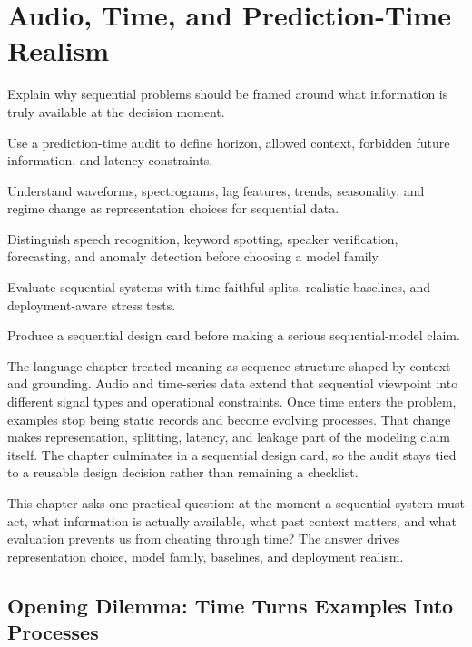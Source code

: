 \chapter{Audio, Time, and Prediction-Time Realism}

\begin{learninggoals}
\item Explain why sequential problems should be framed around what information is truly available at the decision moment.
\item Use a prediction-time audit to define horizon, allowed context, forbidden future information, and latency constraints.
\item Understand waveforms, spectrograms, lag features, trends, seasonality, and regime change as representation choices for sequential data.
\item Distinguish speech recognition, keyword spotting, speaker verification, forecasting, and anomaly detection before choosing a model family.
\item Evaluate sequential systems with time-faithful splits, realistic baselines, and deployment-aware stress tests.
\item Produce a sequential design card before making a serious sequential-model claim.
\end{learninggoals}

The language chapter treated meaning as sequence structure shaped by context and grounding. Audio and time-series data extend that sequential viewpoint into different signal types and operational constraints. Once time enters the problem, examples stop being static records and become evolving processes. That change makes representation, splitting, latency, and leakage part of the modeling claim itself. The chapter culminates in a sequential design card, so the audit stays tied to a reusable design decision rather than remaining a checklist.

\begin{problemsolvinglens}
This chapter asks one practical question: at the moment a sequential system must act, what information is actually available, what past context matters, and what evaluation prevents us from cheating through time? The answer drives representation choice, model family, baselines, and deployment realism.
\end{problemsolvinglens}

\section{Opening Dilemma: Time Turns Examples Into Processes}

